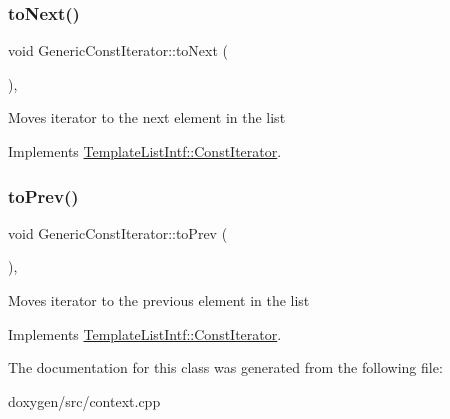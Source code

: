 \mbox{\label{class_generic_const_iterator_a2ac3dc44a25c4790bd2a816b240f6a24}} 
\subsubsection{\texorpdfstring{toNext()}{toNext()}}
{\footnotesize\ttfamily void Generic\+Const\+Iterator\+::to\+Next (\begin{DoxyParamCaption}{ }\end{DoxyParamCaption})\hspace{0.3cm}{\ttfamily [inline]}, {\ttfamily [virtual]}}

Moves iterator to the next element in the list 

Implements \mbox{\hyperlink{class_template_list_intf_1_1_const_iterator_a8656b1ee10ba2625ba91eadb78f8faf7}{Template\+List\+Intf\+::\+Const\+Iterator}}.

\mbox{\label{class_generic_const_iterator_aeafefa5d7969558a52c32817fd8e7457}} 
\subsubsection{\texorpdfstring{toPrev()}{toPrev()}}
{\footnotesize\ttfamily void Generic\+Const\+Iterator\+::to\+Prev (\begin{DoxyParamCaption}{ }\end{DoxyParamCaption})\hspace{0.3cm}{\ttfamily [inline]}, {\ttfamily [virtual]}}

Moves iterator to the previous element in the list 

Implements \mbox{\hyperlink{class_template_list_intf_1_1_const_iterator_a9e5ce362eb61eb772df5afefa5703510}{Template\+List\+Intf\+::\+Const\+Iterator}}.



The documentation for this class was generated from the following file\+:\begin{DoxyCompactItemize}
\item 
doxygen/src/context.\+cpp\end{DoxyCompactItemize}

